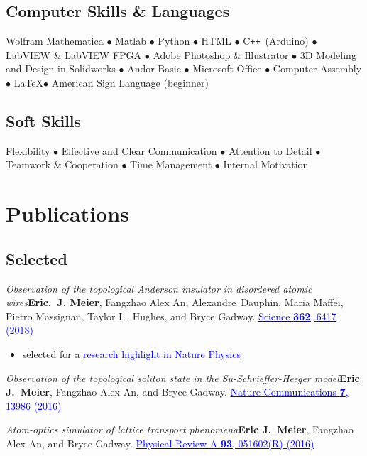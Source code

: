 \documentclass[12pt,letterpaper,sans]{moderncv}
\newcommand*{\paper}[4]{\textit{#1}\newline #2. \newline\href{#3}{\textcolor{blue}{#4}}}
\begin{document}
\subsection{Computer Skills \& Languages}
Wolfram Mathematica $\bullet$ Matlab $\bullet$ Python $\bullet$ HTML $\bullet$ C\texttt{++}~(Arduino) $\bullet$ LabVIEW \& LabVIEW FPGA $\bullet$ Adobe Photoshop \& Illustrator $\bullet$ 3D Modeling and Design in Solidworks $\bullet$ Andor Basic $\bullet$ Microsoft Office $\bullet$ Computer Assembly $\bullet$ \LaTeX $\bullet$ American Sign Language (beginner)

\subsection{Soft Skills}
Flexibility $\bullet$ Effective and Clear Communication $\bullet$ Attention to Detail $\bullet$ Teamwork \& Cooperation $\bullet$ Time Management $\bullet$ Internal Motivation





\section{Publications}

\subsection{Selected}

\begin{etaremune}[start=13,topsep=0pt,itemsep=4pt,partopsep=0pt,parsep=0pt]

\item \paper{Observation of the topological Anderson insulator in disordered atomic wires}{\textbf{Eric.~J. Meier}, Fangzhao Alex An, Alexandre~Dauphin, Maria Maffei, Pietro Massignan, Taylor L.\ Hughes, and Bryce Gadway}{http://science.sciencemag.org/content/362/6417/929.full?ijkey=bU33NGPrjqfmg&keytype=ref&siteid=sci}{Science \textbf{362}, 6417 (2018)}
\begin{itemize}
\item selected for a \href{https://www.nature.com/articles/s41567-018-0399-y}{\textcolor{blue}{research highlight in Nature Physics}}
\end{itemize}

\item \paper{Observation of the topological soliton state in the Su-Schrieffer-Heeger model}{\textbf{Eric J.\ Meier}, Fangzhao Alex An, and Bryce Gadway}{http://www.nature.com/articles/ncomms13986}{Nature Communications \textbf{7}, 13986 (2016)}

\item \paper{Atom-optics simulator of lattice transport phenomena}{\textbf{Eric J.\ Meier}, Fangzhao Alex An, and Bryce Gadway}{http://journals.aps.org/pra/abstract/10.1103/PhysRevA.93.051602}{Physical Review A \textbf{93}, 051602(R) (2016)}
\end{etaremune}
\end{document}
